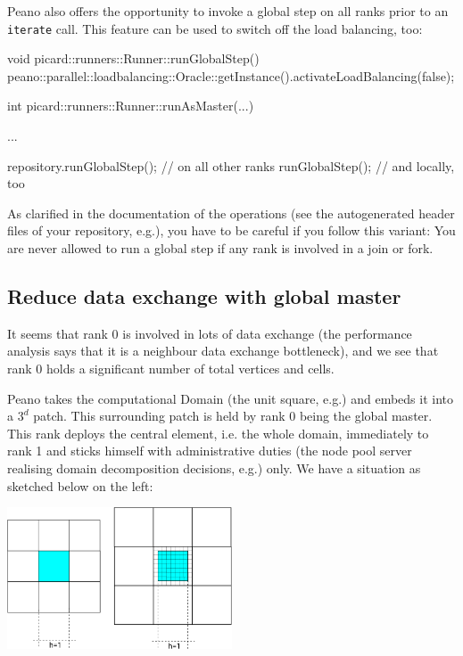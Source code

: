 Peano also offers the opportunity to invoke a
global step on all ranks prior to an \texttt{iterate} call.
This feature can be used to switch off the load balancing, too:

\begin{code}
void picard::runners::Runner::runGlobalStep() {
  peano::parallel::loadbalancing::Oracle::getInstance().activateLoadBalancing(false);
}


int picard::runners::Runner::runAsMaster(...) {
  ...
  
  repository.runGlobalStep(); // on all other ranks
  runGlobalStep();            // and locally, too
}
\end{code}

\noindent
As clarified in the documentation of the operations (see the autogenerated
header files of your repository, e.g.), you have to be careful if you follow
this variant:
You are never allowed to run a global step if any rank is involved in a join or
fork. 


\subsection{Reduce data exchange with global master}
\label{subsection:62:reduce-data-exchange-with-global-master}

\begin{smell}
  It seems that rank 0 is involved in lots of data exchange (the performance
  analysis says that it is a neighbour data exchange bottleneck), and we see
  that rank 0 holds a significant number of total vertices and cells.
\end{smell}

Peano takes the computational Domain (the unit square, e.g.) and embeds it into
a $3^d$ patch. This surrounding patch is held by rank 0 being the global master.
This rank deploys the central element, i.e. the whole domain, immediately to
rank 1 and sticks himself with administrative duties (the node pool server
realising domain decomposition decisions, e.g.) only. 
We have a situation as sketched below on the left:

\begin{center}
  \includegraphics[width=0.5\textwidth]{62_quick-tuning/domain-layout.pdf}
\end{center}

